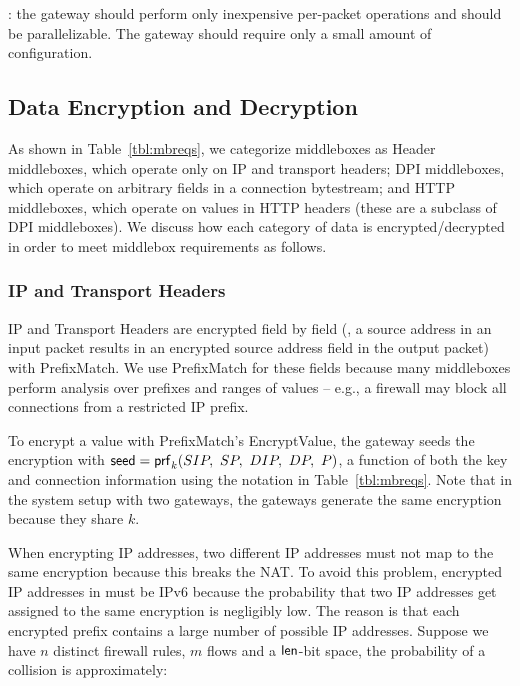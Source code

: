 : the gateway should perform only inexpensive per-packet operations and should be parallelizable. The gateway should require only a small amount of configuration. %


\subsection{Data Encryption and Decryption}
\label{sec:dataenc}

As shown in Table~\ref{tbl:mbreqs}, we categorize middleboxes as Header middleboxes, which operate only on IP and transport headers; DPI middleboxes, which operate on arbitrary fields in a connection bytestream; and HTTP middleboxes, which operate on values in HTTP headers (these are a subclass of DPI middleboxes). We discuss how each category of data is encrypted/decrypted in order to meet middlebox requirements as follows.

\subsubsection{IP and Transport Headers}
IP and Transport Headers are encrypted field by field (\eg{}, a source address in an input packet results in an encrypted source address field in the output packet) with PrefixMatch.
We use PrefixMatch for these fields because many middleboxes perform analysis over prefixes and ranges of values -- e.g., a firewall may block all connections from a restricted IP prefix.


To encrypt a value with PrefixMatch's EncryptValue, the gateway seeds the encryption with  $\seed = \prf_k(SIP,\ SP,\ DIP,\ DP,\ P)$, a function of both the key and connection information using the notation in Table~\ref{tbl:mbreqs}. Note that in the system setup with two gateways, the gateways generate the same encryption because they share $k$.  


When encrypting IP addresses,  two different IP addresses must not map to the same encryption because this breaks the NAT. To avoid this problem, encrypted IP addresses in \sys must be IPv6 because the probability that two IP addresses get assigned to the same encryption is negligibly low. The reason is that each encrypted prefix contains a large number of possible IP addresses. Suppose we have $n$ distinct firewall rules, $m$ flows and a $\mathsf{len}$-bit space, the probability of a collision is approximately: 

